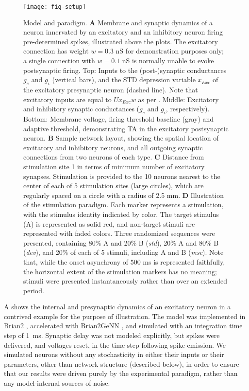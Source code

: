 \documentclass[9pt,lineno,onehalfspacing]{elife}
\newcommand{\dev}{\textit{dev}}
\newcommand{\msc}{\textit{msc}}
\newcommand{\std}{\textit{std}}
\begin{document}
\begin{figure}
    \texttt{[image: fig-setup]}
    \caption{%
        Model and paradigm.
        \textbf{A} Membrane and synaptic dynamics of a neuron innervated by an excitatory and an inhibitory neuron firing pre-determined spikes, illustrated above the plots. The excitatory connection has weight $w = 0.3$ nS for demonstration purposes only; a single connection with $w = 0.1$ nS is normally unable to evoke postsynaptic firing. Top: Inputs to the (post-)synaptic conductances $g_e$ and $g_i$ (vertical bars), and the STD depression variable $x_{Exc}$ of the excitatory presynaptic neuron (dashed line). Note that excitatory inputs are equal to $U x_{Exc} w$ as per . Middle: Excitatory and inhibitory synaptic conductances ($g_e$ and $g_i$, respectively). Bottom: Membrane voltage, firing threshold baseline (gray) and adaptive threshold, demonstrating TA in the excitatory postsynaptic neuron.
        \textbf{B} Sample network layout, showing the spatial location of excitatory and inhibitory neurons, and all outgoing synaptic connections from two neurons of each type.
        \textbf{C} Distance from stimulation site 1 in terms of minimum number of excitatory synapses. Stimulation is provided to the 10 neurons nearest to the center of each of 5 stimulation sites (large circles), which are regularly spaced on a circle with a radius of 2.5 mm.
        \textbf{D} Illustration of the stimulation paradigm. Each marker represents a stimulation, with the stimulus identity indicated by color. The target stimulus (A) is represented as solid red, and non-target stimuli are represented with faded colors. Three randomized sequences were presented, containing 80\% A and 20\% B (\std{}), 20\% A and 80\% B (\dev{}), and 20\% of each of 5 stimuli, including A and B (\msc{}). Note that, while the onset asynchrony of 500 ms is represented faithfully, the horizontal extent of the stimulation markers has no meaning; stimuli were presented instantaneously rather than over an extended period.
    }
    \label{fig:setup}
\end{figure}

A shows the internal and presynaptic dynamics of an excitatory neuron in a contrived example for the purpose of illustration. The model was implemented in Brian2 \citep{Stimberg2019-tc}, accelerated with Brian2GeNN \citep{Stimberg2020-go}, and simulated with an integration time step of 1~ms. Synaptic delay was not modeled explicitly, but spikes were delivered, and voltages reset, in the time step following spike emission. We simulated neurons without any stochasticity in either their inputs or their parameters, other than network structure (described below), in order to ensure that our results were driven purely by the experimental paradigm, rather than any model-internal sources of noise.
\end{document}
